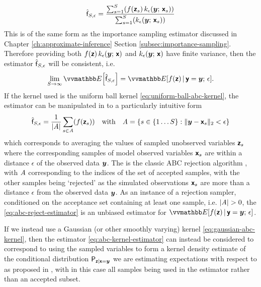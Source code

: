\begin{equation}\label{eq:abc-kernel-estimator}
  \hat{\rvar{f}}_{S,\epsilon} =
  \frac{
  \sum_{s=1}^S \lpa 
    f\lpa\rvct{z}_s\rpa \, 
    k_\epsilon\lpa\vct{y};\,\rvct{x}_s\rpa 
  \rpa
  }
  {
  \sum_{s=1}^S \lpa 
    k_\epsilon\lpa\vct{y};\,\rvct{x}_s\rpa 
  \rpa
  }
\end{equation}
This is of the same form as the importance sampling estimator discussed in Chapter \ref{ch:approximate-inference} Section \ref{subsec:importance-sampling}. Therefore providing both $f(\boldsymbol{\mathsf{z}})\,k_{\epsilon}(\boldsymbol{y};\,\boldsymbol{\mathsf{x}})$ and $k_{\epsilon}(\boldsymbol{y};\,\boldsymbol{\mathsf{x}})$ have finite variance, then the estimator $\hat{\mathsf{f}}_{S,\epsilon}$ will be consistent, i.e.
\begin{equation}
  \lim_{S\to \infty} \expc{\hat{\rvar{f}}_{S,\epsilon}} = \expc{f(\rvct{z}) \gvn \rvct{y} = \vct{y};\,\epsilon}.
\end{equation}
If the kernel used is the uniform ball kernel \eqref{eq:uniform-ball-abc-kernel}, the estimator can be manipulated in to a particularly intuitive form
\begin{equation}\label{eq:abc-reject-estimator}
  \hat{\rvar{f}}_{S,\epsilon} =
  \frac{1}{|\set{A}|}
  \sum_{s\in\set{A}} \lpa 
    f\lpa\rvct{z}_s\rpa
  \rpa
  \quad
  \textrm{with}
  \quad
  \set{A} = \lbr s \in \lbrace 1 \dots S \rbrace : \Vert \vct{y} - \rvct{x}_s \Vert_2 < \epsilon \rbr
\end{equation}
which corresponds to averaging the values of sampled unobserved variables $\boldsymbol{\mathsf{z}}_s$ where the corresponding samples of model observed variables $\boldsymbol{\mathsf{x}}_s$ are within a distance $\epsilon$ of the observed data $\boldsymbol{y}$. The is the classic \ac{ABC} rejection algorithm \citep{rubin1984bayesianly,tavare1997inferring,fu1997estimating,weiss1998inference,pritchard1999population} , with $\mathit{A}$ corresponding to the indices of the set of accepted samples, with the other samples being `rejected' as the simulated observations $\boldsymbol{\mathsf{x}}_s$ are more than a distance $\epsilon$ from the observed data $\boldsymbol{y}$. As an instance of a rejection sampler, conditioned on the acceptance set containing at least one sample, i.e. $|\mathit{A}| > 0$, the \eqref{eq:abc-reject-estimator} is an unbiased estimator for $\expc{f(\rvct{z}) \gvn \rvct{y} = \vct{y};\,\epsilon}$.

If we instead use a Gaussian (or other smoothly varying) kernel \eqref{eq:gaussian-abc-kernel}, then the estimator \eqref{eq:abc-kernel-estimator} can instead be considered to correspond to using the sampled variables to form a kernel density estimate of the conditional distribution $\mathsf{P}_{\boldsymbol{\mathsf{z}}|\boldsymbol{\mathsf{x}}=\boldsymbol{y}}$ we are estimating expectations with respect to as proposed in \citep{beaumont2002approximate}, with in this case all samples being used in the estimator rather than an accepted subset. 

